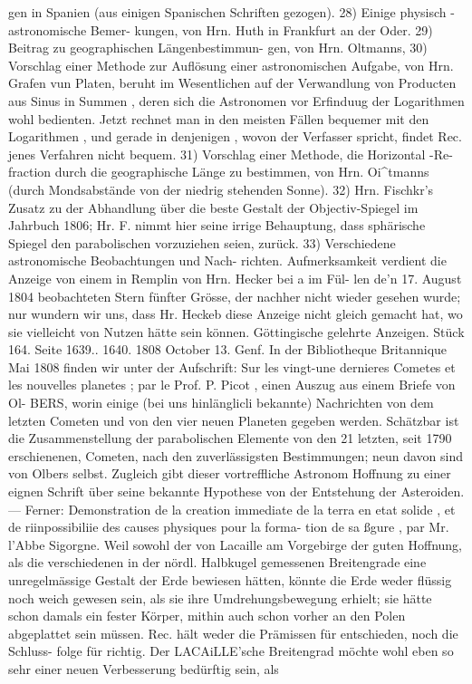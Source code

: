 \documentclass[12pt,a4paper]{article}
\begin{document}
gen  in  Spanien  (aus  einigen  Spanischen  Schriften  gezogen).  28)  Einige  physisch  -  astronomische  Bemer- kungen, von  Hrn.  Huth  in  Frankfurt  an  der  Oder.  29)  Beitrag  zu  geographischen  Längenbestimmun- gen, von  Hrn.  Oltmanns,  30)  Vorschlag  einer  Methode  zur  Auflösung  einer  astronomischen  Aufgabe, von  Hrn.  Grafen  vun  Platen,  beruht  im  Wesentlichen  auf  der  Verwandlung  von  Producten  aus  Sinus  in Summen ,  deren  sich  die  Astronomen  vor  Erfinduug  der  Logarithmen  wohl  bedienten.  Jetzt  rechnet  man in  den  meisten  Fällen  bequemer  mit  den  Logarithmen ,  und  gerade  in  denjenigen ,  wovon  der  Verfasser spricht,  findet  Rec.  jenes  Verfahren  nicht  bequem.  31)  Vorschlag  einer  Methode,  die  Horizontal -Re- fraction  durch  die  geographische  Länge  zu  bestimmen,  von  Hrn.  Oi\textasciicircum{}tmanns  (durch  Mondsabstände  von der  niedrig  stehenden  Sonne).  32)  Hrn.  Fischkr's  Zusatz  zu  der  Abhandlung  über  die  beste  Gestalt  der Objectiv-Spiegel  im  Jahrbuch  1806;  Hr.  F.  nimmt  hier  seine  irrige  Behauptung,  dass  sphärische  Spiegel den  parabolischen  vorzuziehen  seien,  zurück.  33)  Verschiedene  astronomische  Beobachtungen  und  Nach- richten. Aufmerksamkeit  verdient  die  Anzeige  von  einem  in  Remplin  von  Hrn.  Hecker  bei  a  im  Fül- len de'n  17.  August  1804  beobachteten  Stern  fünfter  Grösse,  der  nachher  nicht  wieder  gesehen  wurde; nur  wundern  wir  uns,  dass  Hr.  Heckeb  diese  Anzeige  nicht  gleich  gemacht  hat,  wo  sie  vielleicht  von Nutzen  hätte  sein  können. Göttingische  gelehrte  Anzeigen.     Stück  164.     Seite  1639..  1640.     1808  October  13. Genf.  In  der  Bibliotheque  Britannique  Mai  1808  finden  wir  unter  der  Aufschrift:  Sur  les  vingt-une dernieres  Cometes  et  les  nouvelles  planetes ;  par  le  Prof.  P.  Picot  ,  einen  Auszug  aus  einem  Briefe  von  Ol- BERS,  worin  einige  (bei  uns  hinlänglicli  bekannte)  Nachrichten  von  dem  letzten  Cometen  und  von  den vier  neuen  Planeten  gegeben  werden.  Schätzbar  ist  die  Zusammenstellung  der  parabolischen  Elemente von  den  21  letzten,  seit  1790  erschienenen,  Cometen,  nach  den  zuverlässigsten  Bestimmungen;  neun davon  sind  von  Olbers  selbst.  Zugleich  gibt  dieser  vortreffliche  Astronom  Hoffnung  zu  einer  eignen Schrift  über  seine  bekannte  Hypothese  von  der  Entstehung  der  Asteroiden.  ---  Ferner:  Demonstration de  la  creation  immediate  de  la  terra  en  etat  solide ,  et  de  riinpossibiliie  des  causes  physiques  pour  la  forma- tion  de  sa  ßgure ,  par  Mr.  l'Abbe  Sigorgne.  Weil  sowohl  der  von  Lacaille  am  Vorgebirge  der  guten Hoffnung,  als  die  verschiedenen  in  der  nördl.  Halbkugel  gemessenen  Breitengrade  eine  unregelmässige Gestalt  der  Erde  bewiesen  hätten,  könnte  die  Erde  weder  flüssig  noch  weich  gewesen  sein,  als  sie  ihre Umdrehungsbewegung  erhielt;  sie  hätte  schon  damals  ein  fester  Körper,  mithin  auch  schon  vorher  an den  Polen  abgeplattet  sein  müssen.  Rec.  hält  weder  die  Prämissen  für  entschieden,  noch  die  Schluss- folge für  richtig.  Der  LACAiLLE'sche  Breitengrad  möchte  wohl  eben  so  sehr  einer  neuen  Verbesserung bedürftig  sein,  als  
\end{document}
